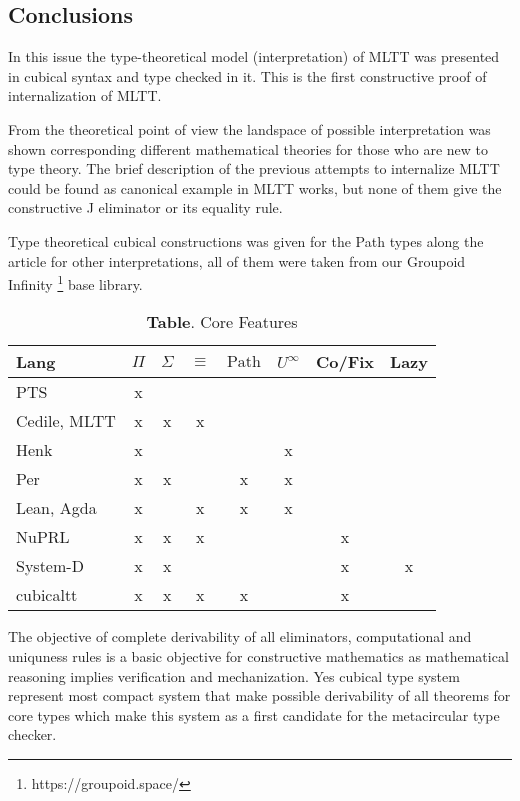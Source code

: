 \documentclass{article}
\theoremstyle{definition}
\begin{document}
\subsection*{Conclusions}

In this issue the type-theoretical model (interpretation) of MLTT was
presented in cubical syntax and type checked in it.
This is the first constructive proof of internalization of MLTT.

From the theoretical point of view the landspace of possible interpretation was shown
corresponding different mathematical theories for those who are new to type theory.
The brief description of the previous attempts to internalize MLTT could
be found as canonical example in MLTT works, but none of them give the constructive
J eliminator or its equality rule.

Type theoretical cubical constructions was given for the Path types
along the article for other interpretations, all of them were taken
from our Groupoid Infinity \footnote{https://groupoid.space/} base library.

\begin{table}[!ht]
  \centering
  \caption*{\textbf{Table}. Core Features}
  \begin{adjustbox}{width=\columnwidth,center}
  \begin{tabular}{lccccccc}
    \hline
       Lang          & $\Pi$ & $\Sigma$ & $\equiv$ & $\text{Path}$ & $U^{\infty}$ & Co/Fix & Lazy\\
    \hline
       PTS           & x \\
       Cedile, MLTT  & x & x & x \\
       Henk          & x &   &   &   & x \\
       Per           & x & x &   & x & x \\
       Lean, Agda    & x &   & x & x & x  \\
       NuPRL         & x & x & x &   &   & x \\
       System-D      & x & x &   &   &   & x & x\\
       cubicaltt     & x & x & x & x &   & x \\
  \end{tabular}
  \end{adjustbox}
\end{table}

The objective of complete derivability of all eliminators, computational and uniquness rules
is a basic objective for constructive mathematics as mathematical reasoning implies verification
and mechanization. Yes cubical type system represent most compact system that make possible
derivability of all theorems for core types which make this system as a first candidate for
the metacircular type checker.
\end{document}
